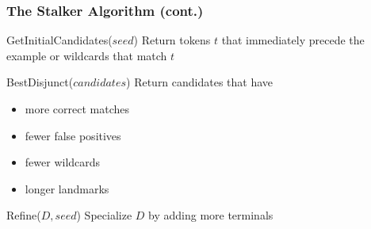 \documentclass[svgnames]{beamer}
\begin{document}

\begin{frame} \frametitle{The Stalker Algorithm (cont.)}
  
  \begin{block}{GetInitialCandidates($seed$)}
    Return tokens $t$ that immediately precede the example or wildcards that
    match $t$
  \end{block}

  \begin{block}{BestDisjunct($candidates$)}
    Return candidates that have
    \begin{itemize}
      \small
    \item more correct matches
    \item fewer false positives
    \item fewer wildcards
    \item longer landmarks
    \end{itemize}
  \end{block}

  \begin{block}{Refine($D,seed$)}
    Specialize $D$ by adding more terminals
  \end{block}

\end{frame}

\end{document}
